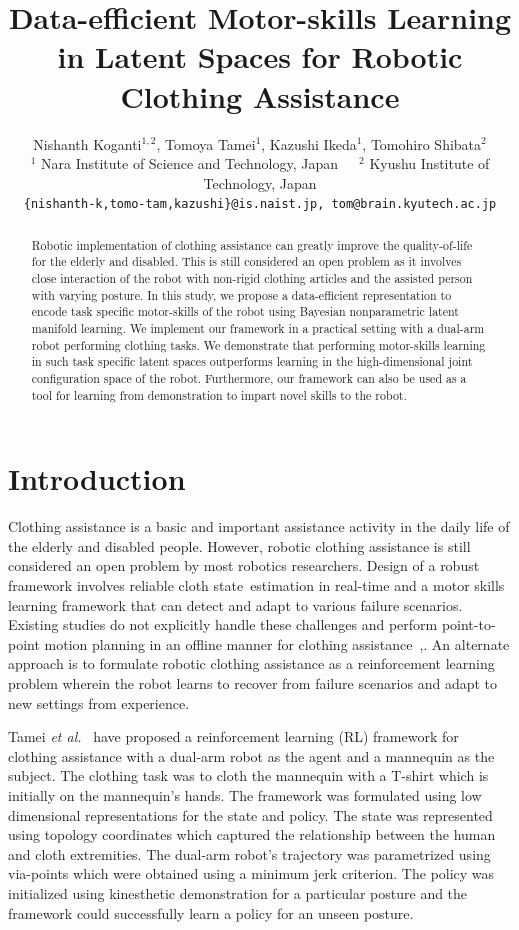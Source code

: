 \documentclass{article}
\title{Data-efficient Motor-skills Learning in Latent Spaces for Robotic Clothing Assistance}
\author{
  Nishanth Koganti$^{1,2}$, Tomoya Tamei$^{1}$, Kazushi Ikeda$^{1}$, Tomohiro Shibata$^{2}$\\
  $^1$ Nara Institute of Science and Technology, Japan~~~$^2$ Kyushu Institute of Technology, Japan\\
  \texttt{\{nishanth-k,tomo-tam,kazushi\}@is.naist.jp, tom@brain.kyutech.ac.jp} \\
}
\begin{document}
\maketitle

\begin{abstract}
Robotic implementation of clothing assistance can greatly improve the quality-of-life for the elderly and disabled. This is still considered an open problem as it involves close interaction of the robot with non-rigid clothing articles and the assisted person with varying posture. In this study, we propose a data-efficient representation to encode task specific motor-skills of the robot using Bayesian nonparametric latent manifold learning. We implement our framework in a practical setting with a dual-arm robot performing clothing tasks. We demonstrate that performing motor-skills learning in such task specific latent spaces outperforms learning in the high-dimensional joint configuration space of the robot. Furthermore, our framework can also be used as a tool for learning from demonstration to impart novel skills to the robot.
\end{abstract}

\section{Introduction}
\label{section:introduction}

Clothing assistance is a basic and important assistance activity in the daily life of the elderly and disabled people. However, robotic clothing assistance is still considered an open problem by most robotics researchers. Design of a robust framework involves reliable cloth state\ estimation in real-time and a motor skills learning framework that can detect and adapt to various failure scenarios. Existing studies do not explicitly handle these challenges and perform point-to-point motion planning in an offline manner for clothing assistance~\cite{yamazaki},\cite{gao}. An alternate approach is to formulate robotic clothing assistance as a reinforcement learning problem wherein the robot learns to recover from failure scenarios and adapt to new settings from experience.

Tamei \emph{et al.}~\cite{tamei} have proposed a reinforcement learning (RL) framework for clothing assistance with a dual-arm robot as the agent and a mannequin as the subject. The clothing task was to cloth the mannequin with a T-shirt which is initially on the mannequin's hands. The framework was formulated using low dimensional representations for the state and policy. The state was represented using topology coordinates which captured the relationship between the human and cloth extremities. The dual-arm robot's trajectory was parametrized using via-points which were obtained using a minimum jerk criterion. The policy was initialized using kinesthetic demonstration for a particular posture and the framework could successfully learn a policy for an unseen posture.
\end{document}
